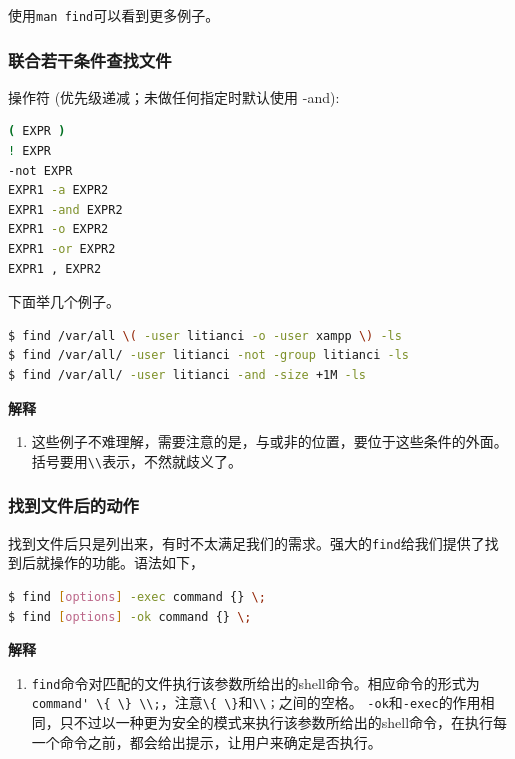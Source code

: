 \documentclass[doctor,openright,twoside]{sjtuthesis}
\providecommand{\tightlist}{%
    \setlength{\itemsep}{0pt}\setlength{\parskip}{0pt}}
\newcommand{\passthrough}[1]{#1}
\theoremstyle{plain}
\theoremstyle{definition}
\theoremstyle{remark}
\theoremstyle{ocrenumbox}
\theoremstyle{plain}
\begin{document}
使用\passthrough{\lstinline!man find!}可以看到更多例子。

\subsubsection{联合若干条件查找文件}

操作符 (优先级递减；未做任何指定时默认使用 -and):

\begin{lstlisting}[language=bash]
( EXPR )
! EXPR
-not EXPR
EXPR1 -a EXPR2
EXPR1 -and EXPR2
EXPR1 -o EXPR2
EXPR1 -or EXPR2
EXPR1 , EXPR2
\end{lstlisting}

下面举几个例子。

\begin{lstlisting}[language=bash]
$ find /var/all \( -user litianci -o -user xampp \) -ls
$ find /var/all/ -user litianci -not -group litianci -ls
$ find /var/all/ -user litianci -and -size +1M -ls
\end{lstlisting}

\textbf{解释}

\begin{enumerate}
\def\labelenumi{\arabic{enumi}.}
\tightlist
\item
  这些例子不难理解，需要注意的是，与或非的位置，要位于这些条件的外面。括号要用\passthrough{\lstinline!\\!}表示，不然就歧义了。
\end{enumerate}

\subsubsection{找到文件后的动作}

找到文件后只是列出来，有时不太满足我们的需求。强大的\passthrough{\lstinline!find!}给我们提供了找到后就操作的功能。语法如下，

\begin{lstlisting}[language=bash]
$ find [options] -exec command {} \;
$ find [options] -ok command {} \;
\end{lstlisting}

\textbf{解释}

\begin{enumerate}
\def\labelenumi{\arabic{enumi}.}
\tightlist
\item
  \passthrough{\lstinline!find!}命令对匹配的文件执行该参数所给出的shell命令。相应命令的形式为\passthrough{\lstinline!command' \{ \} \\;!}，注意\passthrough{\lstinline!\{ \}!}和\passthrough{\lstinline!\\；!}之间的空格。
  \passthrough{\lstinline!-ok!}和\passthrough{\lstinline!-exec!}的作用相同，只不过以一种更为安全的模式来执行该参数所给出的shell命令，在执行每一个命令之前，都会给出提示，让用户来确定是否执行。
\end{enumerate}
\end{document}
